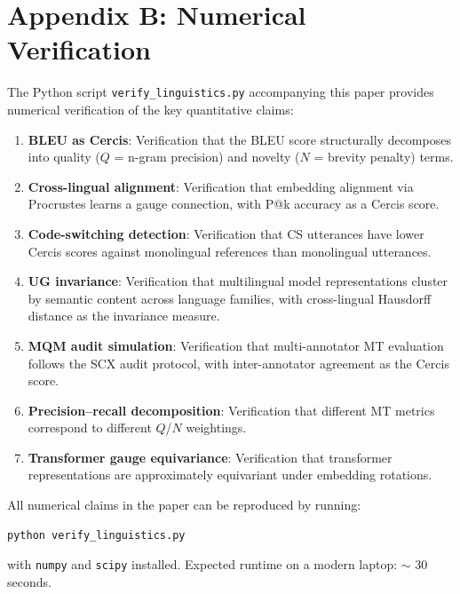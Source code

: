\documentclass[12pt,a4paper]{article}
\theoremstyle{remark}
\newcommand{\SCX}{\textsf{SCX}}
\newcommand{\Cercis}{\textsf{Cercis}}
\begin{document}
\section*{Appendix B: Numerical Verification}
\label{app:numerical}

The Python script \texttt{verify\_linguistics.py} accompanying this
paper provides numerical verification of the key quantitative claims:

\begin{enumerate}[leftmargin=*, label=(\arabic*)]
  \item \textbf{BLEU as Cercis}: Verification that the BLEU score
        structurally decomposes into quality ($Q$ = n-gram precision)
        and novelty ($N$ = brevity penalty) terms.
  \item \textbf{Cross-lingual alignment}: Verification that embedding
        alignment via Procrustes learns a gauge connection, with
        P@k accuracy as a \Cercis{} score.
  \item \textbf{Code-switching detection}: Verification that CS
        utterances have lower \Cercis{} scores against monolingual
        references than monolingual utterances.
  \item \textbf{UG invariance}: Verification that multilingual model
        representations cluster by semantic content across language
        families, with cross-lingual Hausdorff distance as the
        invariance measure.
  \item \textbf{MQM audit simulation}: Verification that multi-annotator
        MT evaluation follows the \SCX{} audit protocol, with
        inter-annotator agreement as the \Cercis{} score.
  \item \textbf{Precision--recall decomposition}: Verification that
        different MT metrics correspond to different $Q$/$N$ weightings.
  \item \textbf{Transformer gauge equivariance}: Verification that
        transformer representations are approximately equivariant
        under embedding rotations.
\end{enumerate}

All numerical claims in the paper can be reproduced by running:
\begin{verbatim}
python verify_linguistics.py
\end{verbatim}
with \texttt{numpy} and \texttt{scipy} installed. Expected runtime
on a modern laptop: $\sim$ 30 seconds.


\end{document}
